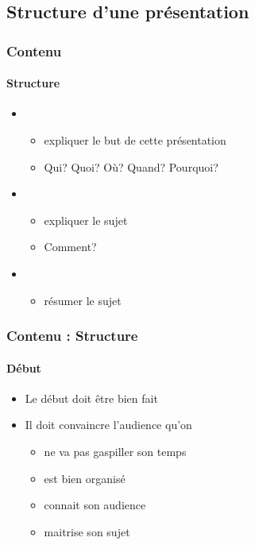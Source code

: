 \documentclass[xcolor=table, usenames,dvipsnames]{beamer}
\begin{document}
\subsection{Structure d'une présentation}

\begin{frame}
\frametitle{Contenu}
\framesubtitle{Structure}

\begin{itemize}
	\item {} 
	\begin{itemize}
		\item expliquer le but de cette présentation
		\item Qui? Quoi? Où? Quand? Pourquoi?
	\end{itemize}
	\item {}
	\begin{itemize}
		\item expliquer le sujet
		\item Comment?
	\end{itemize}
	\item {}
	\begin{itemize}
		\item résumer le sujet
	\end{itemize}
\end{itemize}

\end{frame}

\begin{frame}
\frametitle{Contenu : Structure}
\framesubtitle{Début}

\begin{itemize}
	\item Le début doit être bien fait
	\item Il doit convaincre l'audience qu'on 
	\begin{itemize}
		\item ne va pas gaspiller son temps
		\item est bien organisé
		\item connait son audience
		\item maitrise son sujet
	\end{itemize}
\end{itemize}

\end{frame}
\end{document}
